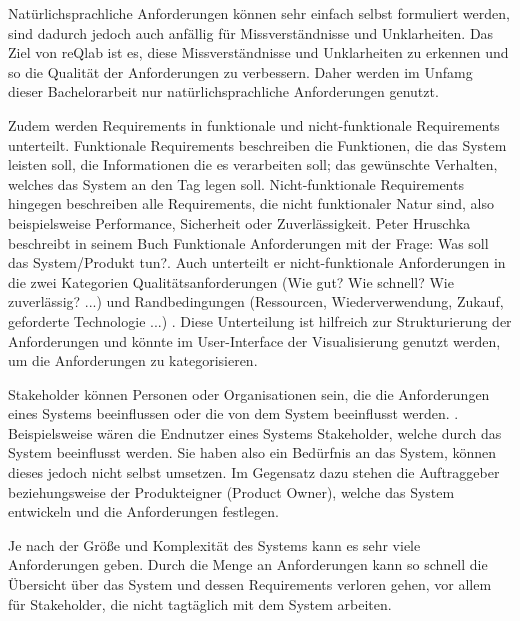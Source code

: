     
    Natürlichsprachliche Anforderungen können sehr einfach selbst formuliert werden, sind dadurch jedoch auch anfällig für Missverständnisse und Unklarheiten.
    Das Ziel von reQlab ist es, diese Missverständnisse und Unklarheiten zu erkennen und so die Qualität der Anforderungen zu verbessern.
    Daher werden im Unfamg dieser Bachelorarbeit nur natürlichsprachliche Anforderungen genutzt.

    Zudem werden Requirements in funktionale und nicht-funktionale Requirements unterteilt.
    Funktionale Requirements beschreiben \glqq{}die Funktionen, die das System leisten soll, die Informationen die es verarbeiten soll; das gewünschte Verhalten, welches das System an den Tag legen soll.\grqq{} \autocite[][S. 12]{Hruschka2023}
    Nicht-funktionale Requirements hingegen beschreiben alle Requirements, die nicht funktionaler Natur sind, also beispielsweise Performance, Sicherheit oder Zuverlässigkeit.
    Peter Hruschka beschreibt in seinem Buch Funktionale Anforderungen mit der Frage: \glqq{}Was soll das System/Produkt tun?\grqq{}.
    Auch unterteilt er nicht-funktionale Anforderungen in die zwei Kategorien Qualitätsanforderungen (\glqq{}Wie gut? Wie schnell? Wie zuverlässig? ...\grqq{}) und Randbedingungen (\glqq{}Ressourcen, Wiederverwendung, Zukauf, geforderte Technologie ...\grqq{}) \grqq{} \autocite[][S. 13]{Hruschka2023}.
    Diese Unterteilung ist hilfreich zur Strukturierung der Anforderungen und könnte im User-Interface der Visualisierung genutzt werden, um die Anforderungen zu kategorisieren.
    

    Stakeholder können \glqq{}Personen oder Organisationen sein, die die Anforderungen eines Systems beeinflussen oder die von dem System beeinflusst werden.\grqq{} \autocite[][]{ireb_cpre_glossary}.
    Beispielsweise wären die Endnutzer eines Systems Stakeholder, welche durch das System beeinflusst werden.
    Sie haben also ein Bedürfnis an das System, können dieses jedoch nicht selbst umsetzen.
    Im Gegensatz dazu stehen die Auftraggeber beziehungsweise der Produkteigner (Product Owner), welche das System entwickeln und die Anforderungen festlegen.

    Je nach der Größe und Komplexität des Systems kann es sehr viele Anforderungen geben.
    Durch die Menge an Anforderungen kann so schnell die Übersicht über das System und dessen Requirements verloren gehen, vor allem für Stakeholder, die nicht tagtäglich mit dem System arbeiten.

